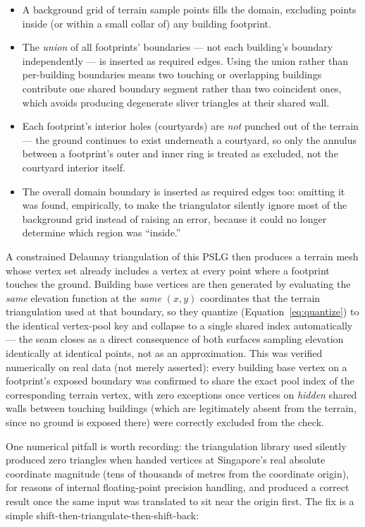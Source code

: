 \documentclass[11pt]{article}
\begin{document}
\begin{itemize}
  \item A background grid of terrain sample points fills the domain, excluding points inside
    (or within a small collar of) any building footprint.
  \item The \emph{union} of all footprints' boundaries --- not each building's boundary
    independently --- is inserted as required edges. Using the union rather than per-building
    boundaries means two touching or overlapping buildings contribute one shared boundary
    segment rather than two coincident ones, which avoids producing degenerate sliver
    triangles at their shared wall.
  \item Each footprint's interior holes (courtyards) are \emph{not} punched out of the terrain
    --- the ground continues to exist underneath a courtyard, so only the annulus between a
    footprint's outer and inner ring is treated as excluded, not the courtyard interior itself.
  \item The overall domain boundary is inserted as required edges too: omitting it was found,
    empirically, to make the triangulator silently ignore most of the background grid instead
    of raising an error, because it could no longer determine which region was ``inside.''
\end{itemize}

A constrained Delaunay triangulation of this PSLG then produces a terrain mesh whose vertex set
already includes a vertex at every point where a footprint touches the ground.
Building base vertices are then generated by evaluating the \emph{same} elevation function at
the \emph{same} $(x,y)$ coordinates that the terrain triangulation used at that boundary, so
they quantize (Equation~\ref{eq:quantize}) to the identical vertex-pool key and collapse to a
single shared index automatically --- the seam closes as a direct consequence of both surfaces
sampling elevation identically at identical points, not as an approximation. This was verified
numerically on real data (not merely asserted): every building base vertex on a footprint's
exposed boundary was confirmed to share the exact pool index of the corresponding terrain
vertex, with zero exceptions once vertices on \emph{hidden} shared walls between touching
buildings (which are legitimately absent from the terrain, since no ground is exposed there)
were correctly excluded from the check.

One numerical pitfall is worth recording: the triangulation library used silently produced
zero triangles when handed vertices at Singapore's real absolute coordinate magnitude
(tens of thousands of metres from the coordinate origin), for reasons of internal
floating-point precision handling, and produced a correct result once the same input was
translated to sit near the origin first. The fix is a simple shift-then-triangulate-then-shift-back:
\end{document}
